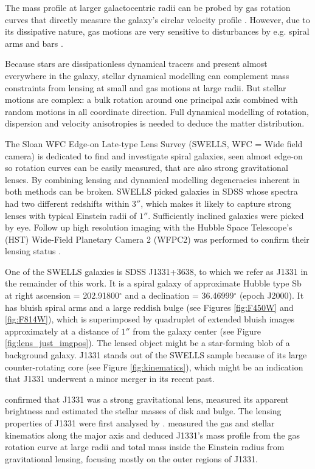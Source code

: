 The mass profile at larger galactocentric radii can be probed by gas rotation curves that directly measure the galaxy's circlar velocity profile \Wilma{[TO DO: REF]}. However, due to its dissipative nature, gas motions are very sensitive to disturbances by e.g. spiral arms and bars \Wilma{[TO DO: REF]}.

Because stars are dissipationless dynamical tracers and present almost everywhere in the galaxy, stellar dynamical modelling can complement mass constraints from lensing at small and gas motions at large radii. But stellar motions are complex: a bulk rotation around one principal axis combined with random motions in all coordinate direction. Full dynamical modelling of rotation, dispersion and velocity anisotropies is needed to deduce the matter distribution.

The Sloan WFC Edge-on Late-type Lens Survey (SWELLS, WFC = Wide field camera) \citep{SWELLSI,SWELLSII,SWELLSIII,SWELLSIV,SWELLSV,SWELLSVI} is dedicated to find and investigate spiral galaxies, seen almost edge-on so rotation curves can be easily measured, that are also strong gravitational lenses. By combining lensing and dynamical modelling degeneracies inherent in both methods can be broken. SWELLS picked galaxies in SDSS whose spectra had two different redshifts within $3''$, which makes it likely to capture strong lenses with typical Einstein radii of $1''$. Sufficiently inclined galaxies were picked by eye. Follow up high resolution imaging with the Hubble Space Telescope's (HST) Wide-Field Planetary Camera 2 (WFPC2) was performed to confirm their lensing status \citep{SWELLSI}.

One of the SWELLS galaxies is SDSS J1331+3638, to which we refer as J1331 in the remainder of this work. It is a spiral galaxy of approximate Hubble type Sb at right ascension = 202.91800$^\circ$ and a declination = 36.46999$^\circ$ (epoch J2000). It has bluish spiral arms and a large reddish bulge (see Figures \ref{fig:F450W} and \ref{fig:F814W}), which is superimposed by quadruplet of extended bluish images approximately at a distance of $1''$ from the galaxy center (see Figure \ref{fig:lens_just_imgpos}). The lensed object might be a star-forming blob of a background galaxy. J1331 stands out of the SWELLS sample because of its large counter-rotating core (see Figure \ref{fig:kinematics}), which might be an indication that J1331 underwent a minor merger in its recent past.

\citet{SWELLSI} confirmed that J1331 was a strong gravitational lens, measured its apparent brightness and estimated the stellar masses of disk and bulge. The lensing properties of J1331 were first analysed by \citet{SWELLSIII}. \citet{SWELLSV} measured the gas and stellar kinematics along the major axis and deduced J1331's mass profile from the gas rotation curve at large radii and total mass inside the Einstein radius from gravitational lensing, focusing mostly on the outer regions of J1331.

